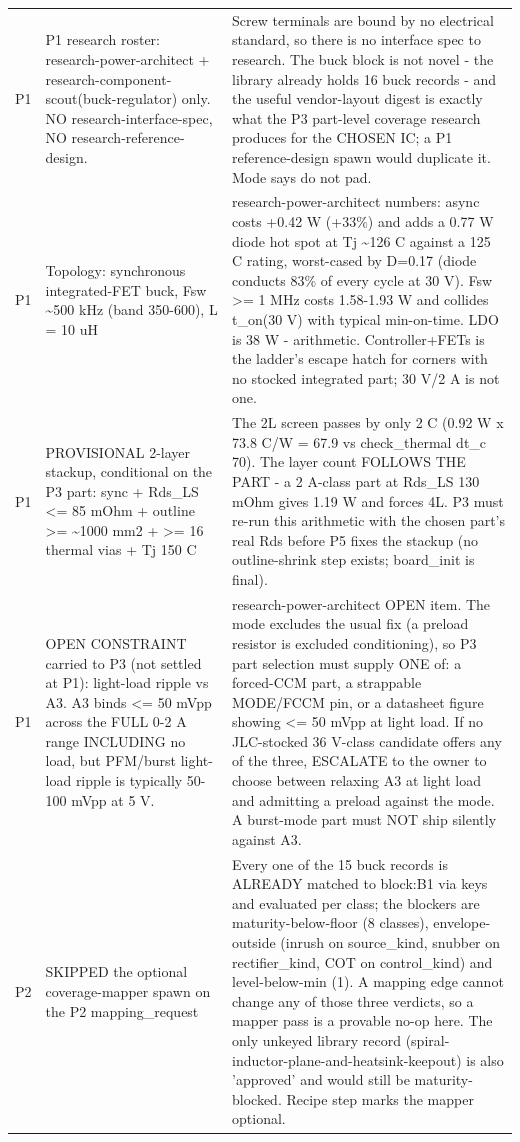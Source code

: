 \documentclass[11pt,a4paper]{article}
\begin{document}
{\begin{longtable}{lp{5.2cm}p{7.2cm}}
P1 & P1 research roster: research-power-architect + research-component-scout(buck-regulator) only. NO research-interface-spec, NO research-reference-design. & Screw terminals are bound by no electrical standard, so there is no interface spec to research. The buck block is not novel - the library already holds 16 buck records - and the useful vendor-layout digest is exactly what the P3 part-level coverage research produces for the CHOSEN IC; a P1 reference-design spawn would duplicate it. Mode says do not pad. \\
P1 & Topology: synchronous integrated-FET buck, Fsw \textasciitilde{}500 kHz (band 350-600), L = 10 uH & research-power-architect numbers: async costs +0.42 W (+33\%) and adds a 0.77 W diode hot spot at Tj \textasciitilde{}126 C against a 125 C rating, worst-cased by D=0.17 (diode conducts 83\% of every cycle at 30 V). Fsw \textgreater{}= 1 MHz costs 1.58-1.93 W and collides t\_on(30 V) with typical min-on-time. LDO is 38 W - arithmetic. Controller+FETs is the ladder's escape hatch for corners with no stocked integrated part; 30 V/2 A is not one. \\
P1 & PROVISIONAL 2-layer stackup, conditional on the P3 part: sync + Rds\_LS \textless{}= 85 mOhm + outline \textgreater{}= \textasciitilde{}1000 mm2 + \textgreater{}= 16 thermal vias + Tj 150 C & The 2L screen passes by only 2 C (0.92 W x 73.8 C/W = 67.9 vs check\_thermal dt\_c 70). The layer count FOLLOWS THE PART - a 2 A-class part at Rds\_LS 130 mOhm gives 1.19 W and forces 4L. P3 must re-run this arithmetic with the chosen part's real Rds before P5 fixes the stackup (no outline-shrink step exists; board\_init is final). \\
P1 & OPEN CONSTRAINT carried to P3 (not settled at P1): light-load ripple vs A3. A3 binds \textless{}= 50 mVpp across the FULL 0-2 A range INCLUDING no load, but PFM/burst light-load ripple is typically 50-100 mVpp at 5 V. & research-power-architect OPEN item. The mode excludes the usual fix (a preload resistor is excluded conditioning), so P3 part selection must supply ONE of: a forced-CCM part, a strappable MODE/FCCM pin, or a datasheet figure showing \textless{}= 50 mVpp at light load. If no JLC-stocked 36 V-class candidate offers any of the three, ESCALATE to the owner to choose between relaxing A3 at light load and admitting a preload against the mode. A burst-mode part must NOT ship silently against A3. \\
P2 & SKIPPED the optional coverage-mapper spawn on the P2 mapping\_request & Every one of the 15 buck records is ALREADY matched to block:B1 via keys and evaluated per class; the blockers are maturity-below-floor (8 classes), envelope-outside (inrush on source\_kind, snubber on rectifier\_kind, COT on control\_kind) and level-below-min (1). A mapping edge cannot change any of those three verdicts, so a mapper pass is a provable no-op here. The only unkeyed library record (spiral-inductor-plane-and-heatsink-keepout) is also 'approved' and would still be maturity-blocked. Recipe step marks the mapper optional. \\

\end{longtable}}
\end{document}
